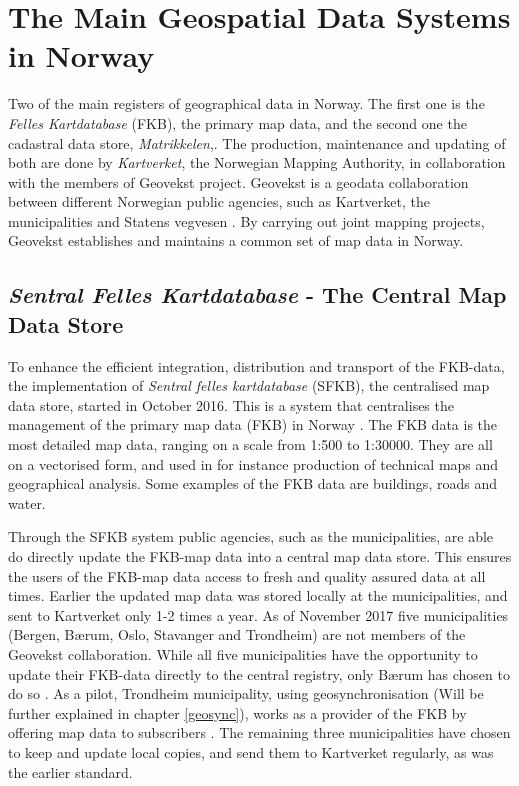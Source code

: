 

\chapter{The Main Geospatial Data Systems in Norway}\label{chap:examples}
Two of the main registers of geographical data in Norway. The first one is  the \textit{Felles Kartdatabase} (FKB), the primary map data,  and the second one the cadastral data store, \textit{Matrikkelen},. The production, maintenance and updating of both are done by \textit{Kartverket}, the Norwegian Mapping Authority, in collaboration with the members of Geovekst project. Geovekst is a geodata collaboration between different Norwegian public agencies, such as Kartverket, the municipalities and Statens vegvesen \citep{Kartverket2017a}. By carrying out joint mapping projects, Geovekst establishes and maintains a common set of map data in Norway. 

\section{\textit{Sentral Felles Kartdatabase} - The Central Map Data Store}\label{SFKB}
To enhance the efficient integration, distribution and transport of the FKB-data, the implementation of \textit{Sentral felles kartdatabase} (SFKB), the centralised map data store, started in October 2016. This is a system that centralises the management of the primary map data (FKB) in Norway \citep{Kartverket2017}. The FKB data is the most detailed map data, ranging on a scale from 1:500 to 1:30000. They are all on a vectorised form, and used in for instance production of technical maps and geographical analysis. Some examples of the FKB data are buildings, roads and water. 

Through the SFKB system public agencies, such as the municipalities, are able do directly update the FKB-map data into a central map data store. This ensures the users of the FKB-map data access to fresh and quality assured data at all times. Earlier the updated map data was stored locally at the municipalities, and sent to Kartverket only 1-2 times a year. As of November 2017 five municipalities (Bergen, Bærum, Oslo, Stavanger and Trondheim) are not members of the Geovekst collaboration. While all five municipalities have the opportunity to update their FKB-data directly to the central registry, only Bærum has chosen to do so \citep{Kartverket2017}. As a pilot, Trondheim municipality, using geosynchronisation (Will be further explained in chapter \ref{geosync}), works as a provider of the FKB by offering map data to subscribers \citep{Saether2016,Sandal2016}. The remaining three municipalities have chosen to keep and update local copies, and send them to Kartverket regularly, as was the earlier standard.

